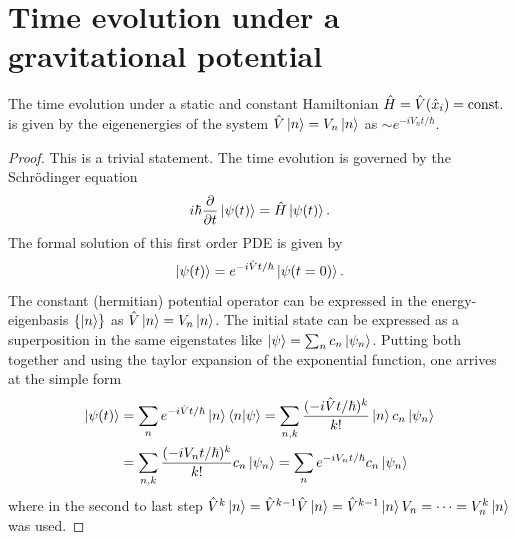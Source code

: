 \section{Time evolution under a gravitational potential}

\begin{proposition} \label{proposition:time-evolution}
  The time evolution under a static and constant Hamiltonian $\hat{H} = \hat{V}(\hat{x}_i) = \mathrm{const.}$ is given by the eigenenergies of the system $\hat{V}\ket{n} = V_n\ket{n}$ as $\sim e^{-iV_nt/\hbar}$.
\end{proposition}
\begin{proof}
  This is a trivial statement. The time evolution is governed by the Schrödinger equation
  \begin{equation}
    i\hbar \pdv{t}\ket{\psi(t)} = \hat{H} \ket{\psi(t)} .
  \end{equation}
  The formal solution of this first order PDE is given by
  \begin{equation}
    \ket{\psi(t)} = e^{-i\hat{V}t/\hbar} \ket{\psi(t=0)} .
  \end{equation}
  The constant (hermitian) potential operator can be expressed in the energy-eigenbasis $\left\{\ket{n}\right\}$ as $\hat{V}\ket{n} = V_n\ket{n}$. The initial state can be expressed as a superposition in the same eigenstates like $\ket{\psi} = \sum_n c_n \ket{\psi_n}$. Putting both together and using the taylor expansion of the exponential function, one arrives at the simple form
  \begin{align}
    \ket{\psi(t)} &= \sum_n e^{-i\hat{V}t/\hbar} \ket{n} \braket{n}{\psi} = \sum_{n,k} \frac{(-i\hat{V}t/\hbar)^k}{k!} \ket{n} c_n \ket{\psi_n} \\
    &= \sum_{n,k} \frac{(-iV_n t/\hbar)^k}{k!} c_n \ket{\psi_n} 
    = \sum_n e^{-iV_nt/\hbar} c_n \ket{\psi_n}
  \end{align}
  where in the second to last step $\hat{V}^k\ket{n} = \hat{V}^{k-1}\hat{V}\ket{n} = \hat{V}^{k-1}\ket{n} V_n = \dots = V_n^k\ket{n}$ was used.
\end{proof}


